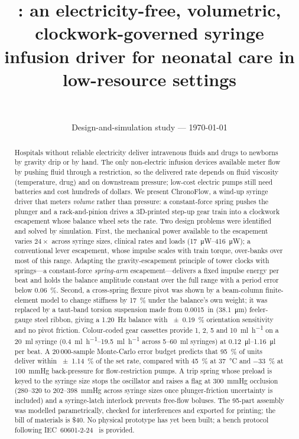 \documentclass[11pt,a4paper]{article}
\title{\ChronoFlow: an electricity-free, volumetric, clockwork-governed syringe infusion driver for neonatal care in low-resource settings}
\author{~}
\date{Design-and-simulation study --- \today}
\newcommand{\ChronoFlow}{ChronoFlow}
\begin{document}
\maketitle

\begin{abstract}
Hospitals without reliable electricity deliver intravenous fluids and drugs to newborns by gravity drip or by hand. The only non-electric infusion devices available meter flow by pushing fluid through a restriction, so the delivered rate depends on fluid viscosity (temperature, drug) and on downstream pressure; low-cost electric pumps still need batteries and cost hundreds of dollars. We present \ChronoFlow, a wind-up syringe driver that meters \emph{volume} rather than pressure: a constant-force spring pushes the plunger and a rack-and-pinion drives a 3D-printed step-up gear train into a clockwork escapement whose balance wheel sets the rate. Two design problems were identified and solved by simulation. First, the mechanical power available to the escapement varies $24\times$ across syringe sizes, clinical rates and loads (\SIrange{17}{416}{\micro\watt}); a conventional lever escapement, whose impulse scales with train torque, over-banks over most of this range. Adapting the gravity-escapement principle of tower clocks with springs---a constant-force \emph{spring-arm} escapement---delivers a fixed impulse energy per beat and holds the balance amplitude constant over the full range with a period error below \SI{0.06}{\percent}. Second, a cross-spring flexure pivot was shown by a beam-column finite-element model to change stiffness by \SI{17}{\percent} under the balance's own weight; it was replaced by a taut-band torsion suspension made from \SI{0.0015}{in} (\SI{38.1}{\micro\metre}) feeler-gauge steel ribbon, giving a \SI{1.20}{\hertz} balance with \SI{\pm 0.19}{\percent} orientation sensitivity and no pivot friction. Colour-coded gear cassettes provide 1, 2, 5 and \SI{10}{\milli\litre\per\hour} on a \SI{20}{\milli\litre} syringe (\SIrange{0.4}{19.5}{\milli\litre\per\hour} across 5--\SI{60}{\milli\litre} syringes) at \SIrange{0.12}{1.16}{\micro\litre} per beat. A 20\,000-sample Monte-Carlo error budget predicts that \SI{95}{\percent} of units deliver within \SI{\pm 1.14}{\percent} of the set rate, compared with \SI{+45}{\percent} at \SI{37}{\celsius} and \SI{-33}{\percent} at \SI{100}{mmHg} back-pressure for flow-restriction pumps. A trip spring whose preload is keyed to the syringe size stops the oscillator and raises a flag at \SI{300}{mmHg} occlusion (280--320 to 202--\SI{398}{mmHg} across syringe sizes once plunger-friction uncertainty is included) and a syringe-latch interlock prevents free-flow boluses. The 95-part assembly was modelled parametrically, checked for interferences and exported for printing; the bill of materials is \$40. No physical prototype has yet been built; a bench protocol following IEC~60601-2-24~\cite{iec} is provided.
\end{abstract}
\end{document}
